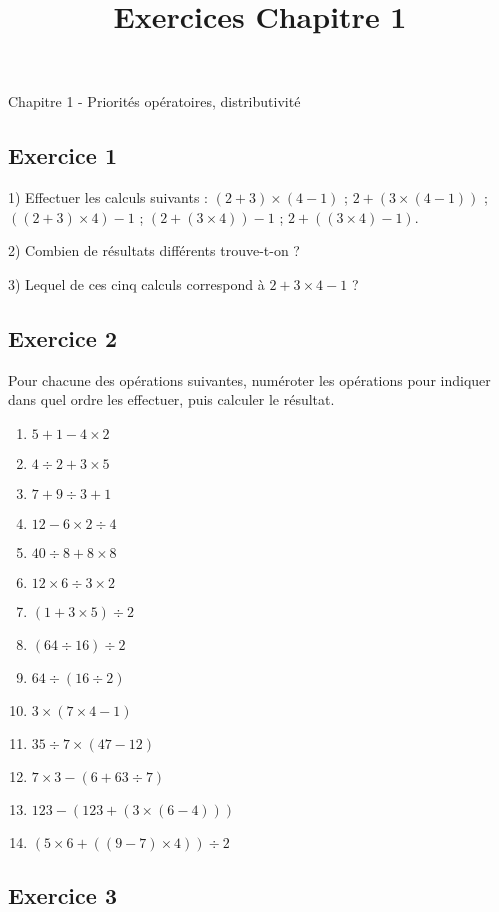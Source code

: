 \documentclass[12 pt]{extarticle}
\title{Exercices Chapitre 1}
\date{}
\theoremstyle{plain}
\begin{document}
\begin{center}{\Large Chapitre 1 - Priorités opératoires, distributivité}\\ 
 \end{center}
 
 
 \subsection*{Exercice 1}

 
1) Effectuer les calculs suivants : $(2 + 3) \times (4 - 1)$ ; 
$ 2 + ( 3 \times (4 - 1) ) $ ; 
$( ( 2 + 3 ) \times 4 ) - 1 $ ; 
$ ( 2 + ( 3 \times 4 ) ) - 1$ ; 
$2 + ((3 \times 4) - 1)$. 

2) Combien de résultats différents trouve-t-on ? 

3) Lequel de ces cinq calculs correspond à $ 2 + 3 \times 4 - 1$ ?

\subsection*{Exercice 2}
 
 
 Pour chacune des opérations suivantes, numéroter les opérations 
 pour indiquer dans quel ordre les effectuer, puis calculer le 
 résultat. 
 \begin{enumerate}
 \item $5 + 1 - 4 \times 2$
 \item$4 \div 2 + 3 \times 5$ 
 \item $7 + 9 \div 3 + 1$
 \item $12 - 6 \times 2 \div 4$
 \item $40 \div 8 + 8 \times 8$
 \item $12 \times 6 \div 3 \times 2$
 \item $(1 + 3 \times 5) \div 2$
 \item $(64\div 16) \div 2$
 \item $64\div (16 \div 2)$
 \item $3 \times ( 7 \times 4 -1)$
 \item $35 \div 7\times (47-12)$
 \item $ 7\times 3  - (6 + 63\div 7)$
 \item $123 - (123 + (3 \times (6-4)))$
  \item $ (5 \times 6+ ((9-7)\times 4))\div 2$
 \end{enumerate}
 
 \subsection*{Exercice 3} 
 
\end{document}
